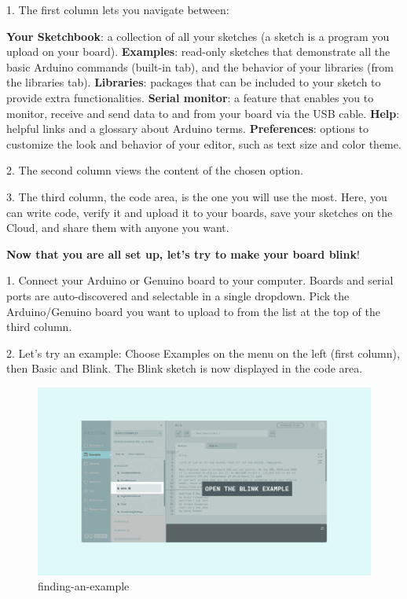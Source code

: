 1. The first column lets you navigate between:

\textbf{Your Sketchbook}: a collection of all your sketches (a sketch is a program you upload on your board). \newline
\textbf{Examples}: read-only sketches that demonstrate all the basic Arduino commands (built-in tab), and the behavior of your libraries (from the libraries tab). \newline
\textbf{Libraries}: packages that can be included to your sketch to provide extra functionalities. \newline
\textbf{Serial monitor}: a feature that enables you to monitor, receive and send data to and from your board via the USB cable. \newline
\textbf{Help}: helpful links and a glossary about Arduino terms. \newline
\textbf{Preferences}: options to customize the look and behavior of your editor, such as text size and color theme.
\newline

2. The second column views the content of the chosen option.

3. The third column, the code area, is the one you will use the most. Here, you can write code, verify it and upload it to your boards, save your sketches on the Cloud, and share them with anyone you want.

\textbf{Now that you are all set up, let’s try to make your board blink}!

1. Connect your Arduino or Genuino board to your computer. Boards and serial ports are auto-discovered and selectable in a single dropdown. Pick the Arduino/Genuino board you want to upload to from the list at the top of the third column.

2. Let’s try an example: Choose Examples on the menu on the left (first column), then Basic and Blink. The Blink sketch is now displayed in the code area. 

\begin{figure}
	\begin{center}
		\includegraphics[width=0.7\linewidth]{Images/Arduino/finding-an-example.png}
		\caption{finding-an-example}
		\label{finding-an-example}
	\end{center}
\end{figure}

